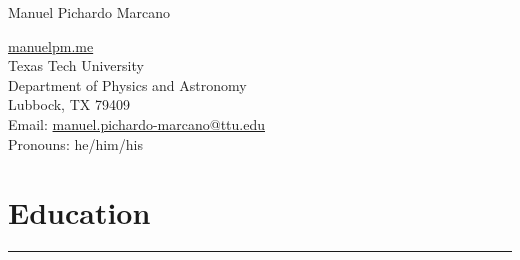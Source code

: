 \documentclass[letterpaper,10pt]{article}
\def\name{Manuel Pichardo Marcano}
\begin{document}
\begin{huge}
\name
\end{huge}





\vspace{.3 cm}

\begin{minipage}{0.6\linewidth}
  \href{www.manuelpm.me}{manuelpm.me} \\
Texas Tech University \\
  Department of Physics and Astronomy \\
  Lubbock, TX 79409\\
Email:  \href{mailto:manuel.pichardo-marcano@ttu.edu}{manuel.pichardo-marcano@ttu.edu}\\
 Pronouns: he/him/his 
\end{minipage}

\section*{Education}

\hrule
\vspace{.3 cm}
\end{document}
